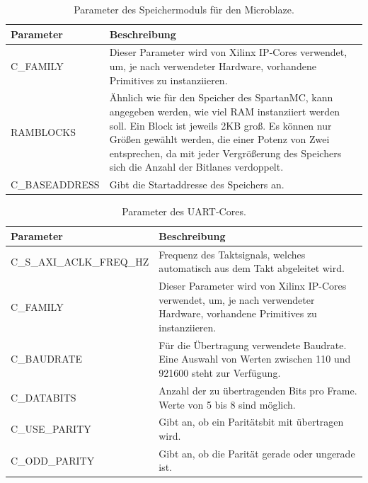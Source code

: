 \begin{table}[ht!]
	\begin{tabular}{|l|p{10cm}|}
		\hline \textbf{Parameter} & \textbf{Beschreibung} \\ 
		\hline C\_FAMILY & Dieser Parameter wird von Xilinx IP-Cores verwendet, um, je nach verwendeter Hardware, vorhandene Primitives zu instanziieren. \\ 
		\hline RAMBLOCKS & Ähnlich wie für den Speicher des SpartanMC, kann angegeben werden, wie viel RAM instanziiert werden soll. Ein Block ist jeweils 2KB groß. Es können nur Größen gewählt werden, die einer Potenz von Zwei entsprechen, da mit jeder Vergrößerung des Speichers sich die Anzahl der Bitlanes verdoppelt.\\ 
		\hline C\_BASEADDRESS & Gibt die Startaddresse des Speichers an.\\ 
		\hline 
	\end{tabular}
	\centering
	\caption{Parameter des Speichermoduls für den Microblaze.}
	\label{tab:MemParam}
\end{table}

\begin{table}[ht!]
	\begin{tabular}{|l|p{10cm}|}
		\hline \textbf{Parameter} & \textbf{Beschreibung} \\ 
		\hline C\_S\_AXI\_ACLK\_FREQ\_HZ & Frequenz des Taktsignals, welches automatisch aus dem Takt abgeleitet wird.\\ 
		\hline C\_FAMILY & Dieser Parameter wird von Xilinx IP-Cores verwendet, um, je nach verwendeter Hardware, vorhandene Primitives zu instanziieren.\\ 
		\hline C\_BAUDRATE & Für die Übertragung verwendete Baudrate. Eine Auswahl von Werten zwischen 110 und 921600 steht zur Verfügung. \\ 
		\hline C\_DATABITS & Anzahl der zu übertragenden Bits pro Frame. Werte von 5 bis 8 sind möglich. \\ 
		\hline C\_USE\_PARITY & Gibt an, ob ein Paritätsbit mit übertragen wird. \\ 
		\hline C\_ODD\_PARITY & Gibt an, ob die Parität gerade oder ungerade ist. \\ 
		\hline 
	\end{tabular}
	\centering
	\caption{Parameter des UART-Cores.}
	\label{tab:UARTParam}
\end{table}

